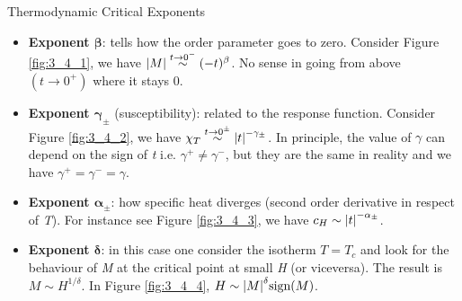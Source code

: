 \documentclass[../main/main.tex]{subfiles}
\begin{document}
\begin{definition}{Thermodynamic Critical Exponents}{}
\begin{itemize}
\item \textbf{Exponent \( \pmb{\beta} \)}: tells how the order parameter goes to zero.
Consider Figure \ref{fig:3_4_1}, we have \( \abs{M} \overset{t \rightarrow  0^-}{\sim} (-t)^{\beta }  \). No sense in going from above \( (t \rightarrow 0^+) \) where it stays 0.

\item \textbf{Exponent \(\pmb{ \gamma _{\pm} } \)} (susceptibility): related to the response function. Consider Figure \ref{fig:3_4_2}, we have \( \chi _T \overset{t \rightarrow 0^{\pm}}{\sim} \abs{t}^{-\gamma _{\pm} }   \). In principle, the value of \( \gamma   \) can depend on the sign of \emph{t} i.e.   \( \gamma ^+ \neq \gamma ^-  \), but they are the same in reality and we have \( \gamma ^+ = \gamma ^- = \gamma     \).

\item \textbf{Exponent \(\pmb{ \alpha _{\pm} }\)}: how specific heat diverges (second order derivative in respect of \emph{T}). For instance see Figure \ref{fig:3_4_3}, we have \( c_H \sim \abs{t}^{-\alpha _{\pm}}  \).

\item \textbf{Exponent \( \pmb{\delta   }\)}: in this case one consider the isotherm \( T =T_c \) and look for the behaviour of \emph{M} at the critical point at small \emph{H} (or viceversa).  The result is \( M \sim H^{1/\delta } \).
In Figure \ref{fig:3_4_4}, \( H \sim \abs{M}^{\delta } \text{sign} (M)  \).

\end{itemize}
\end{definition}
\end{document}
